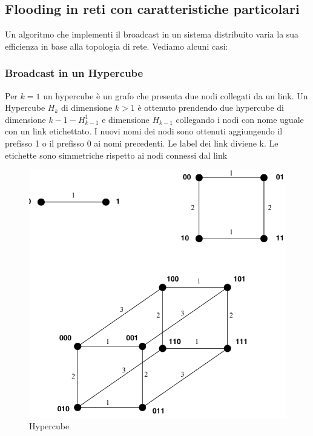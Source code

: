 \documentclass[12pt]{article}
\begin{document}
		
		
	\subsection{Flooding in reti con caratteristiche particolari}
		Un algoritmo che implementi il broadcast in un sistema distribuito varia la sua efficienza in base alla topologia di rete. Vediamo alcuni casi:
		\subsubsection{Broadcast in un Hypercube}
			Per $k=1$ un hypercube è un grafo che presenta due nodi collegati da un link.
			Un Hypercube $H_k$ di dimensione $k>1$ è ottenuto prendendo due hypercube di dimensione $k-1-H^{1}_{k-1}$ e dimensione $H_{k-1}$ collegando i nodi con nome uguale con un link etichettato. I nuovi nomi dei nodi sono ottenuti aggiungendo il prefisso 1 o il prefisso 0 ai nomi precedenti. Le label dei link diviene k.  Le etichette sono simmetriche rispetto ai nodi connessi dal link\\
			\begin{figure}[h!]
				\centering
				\includegraphics[scale=0.35]{img/hyper.png}
				\caption{Hypercube}
			\end{figure}
\end{document}
